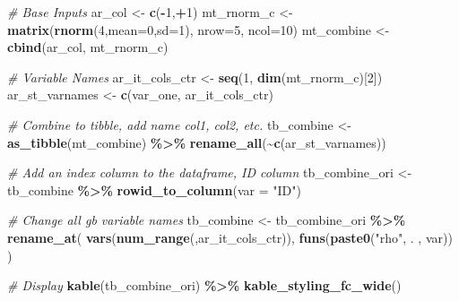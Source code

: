 \documentclass[
]{book}
\newenvironment{Shaded}{\begin{snugshade}}{\end{snugshade}}
\newcommand{\CommentTok}[1]{\textcolor[rgb]{0.56,0.35,0.01}{\textit{#1}}}
\newcommand{\DataTypeTok}[1]{\textcolor[rgb]{0.13,0.29,0.53}{#1}}
\newcommand{\DecValTok}[1]{\textcolor[rgb]{0.00,0.00,0.81}{#1}}
\newcommand{\KeywordTok}[1]{\textcolor[rgb]{0.13,0.29,0.53}{\textbf{#1}}}
\newcommand{\NormalTok}[1]{#1}
\newcommand{\OperatorTok}[1]{\textcolor[rgb]{0.81,0.36,0.00}{\textbf{#1}}}
\newcommand{\StringTok}[1]{\textcolor[rgb]{0.31,0.60,0.02}{#1}}
\begin{document}
\begin{Shaded}
\begin{Highlighting}[]
\CommentTok{\# Base Inputs}
\NormalTok{ar\_col \textless{}{-}}\StringTok{ }\KeywordTok{c}\NormalTok{(}\OperatorTok{{-}}\DecValTok{1}\NormalTok{,}\OperatorTok{+}\DecValTok{1}\NormalTok{)}
\NormalTok{mt\_rnorm\_c \textless{}{-}}\StringTok{ }\KeywordTok{matrix}\NormalTok{(}\KeywordTok{rnorm}\NormalTok{(}\DecValTok{4}\NormalTok{,}\DataTypeTok{mean=}\DecValTok{0}\NormalTok{,}\DataTypeTok{sd=}\DecValTok{1}\NormalTok{), }\DataTypeTok{nrow=}\DecValTok{5}\NormalTok{, }\DataTypeTok{ncol=}\DecValTok{10}\NormalTok{)}
\NormalTok{mt\_combine \textless{}{-}}\StringTok{ }\KeywordTok{cbind}\NormalTok{(ar\_col, mt\_rnorm\_c)}

\CommentTok{\# Variable Names}
\NormalTok{ar\_it\_cols\_ctr \textless{}{-}}\StringTok{ }\KeywordTok{seq}\NormalTok{(}\DecValTok{1}\NormalTok{, }\KeywordTok{dim}\NormalTok{(mt\_rnorm\_c)[}\DecValTok{2}\NormalTok{])}
\NormalTok{ar\_st\_varnames \textless{}{-}}\StringTok{ }\KeywordTok{c}\NormalTok{(}\StringTok{\textquotesingle{}var\_one\textquotesingle{}}\NormalTok{, ar\_it\_cols\_ctr)}

\CommentTok{\# Combine to tibble, add name col1, col2, etc.}
\NormalTok{tb\_combine \textless{}{-}}\StringTok{ }\KeywordTok{as\_tibble}\NormalTok{(mt\_combine) }\OperatorTok{\%\textgreater{}\%}\StringTok{ }\KeywordTok{rename\_all}\NormalTok{(}\OperatorTok{\textasciitilde{}}\KeywordTok{c}\NormalTok{(ar\_st\_varnames))}

\CommentTok{\# Add an index column to the dataframe, ID column}
\NormalTok{tb\_combine\_ori \textless{}{-}}\StringTok{ }\NormalTok{tb\_combine }\OperatorTok{\%\textgreater{}\%}\StringTok{ }\KeywordTok{rowid\_to\_column}\NormalTok{(}\DataTypeTok{var =} \StringTok{"ID"}\NormalTok{)}

\CommentTok{\# Change all gb variable names}
\NormalTok{tb\_combine \textless{}{-}}\StringTok{ }\NormalTok{tb\_combine\_ori }\OperatorTok{\%\textgreater{}\%}
\StringTok{                  }\KeywordTok{rename\_at}\NormalTok{(}
                    \KeywordTok{vars}\NormalTok{(}\KeywordTok{num\_range}\NormalTok{(}\StringTok{\textquotesingle{}\textquotesingle{}}\NormalTok{,ar\_it\_cols\_ctr)),}
                    \KeywordTok{funs}\NormalTok{(}\KeywordTok{paste0}\NormalTok{(}\StringTok{"rho"}\NormalTok{, . , }\StringTok{\textquotesingle{}var\textquotesingle{}}\NormalTok{))}
\NormalTok{                    )}

\CommentTok{\# Display}
\KeywordTok{kable}\NormalTok{(tb\_combine\_ori) }\OperatorTok{\%\textgreater{}\%}\StringTok{ }\KeywordTok{kable\_styling\_fc\_wide}\NormalTok{()}
\end{Highlighting}
\end{Shaded}
\end{document}

